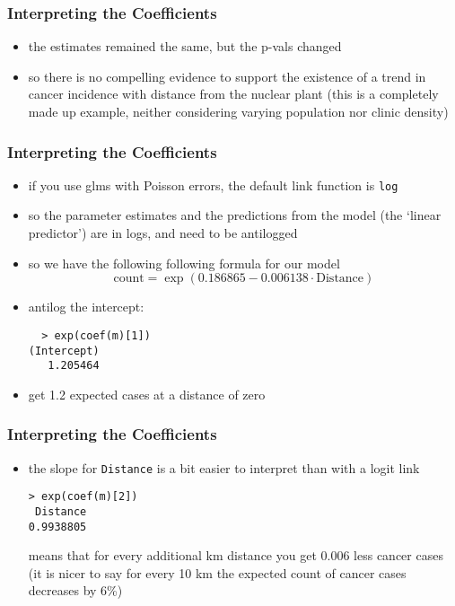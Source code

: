 \begin{frame}[fragile]\frametitle{Interpreting the Coefficients}
  \begin{itemize}
  \item the estimates remained the same, but the p-vals changed
  \item so there is no compelling evidence to support the existence of a trend in cancer incidence with distance
from the nuclear plant (this is a completely made up example, neither considering varying population nor clinic density)
  \end{itemize}
\end{frame}


\begin{frame}[fragile]\frametitle{Interpreting the Coefficients}
  \begin{itemize}
  \item if you use glms with Poisson errors, the default link function is \texttt{log}
  \item so the parameter estimates and the predictions from the model (the ‘linear predictor’) are in logs, and need to be antilogged
  \item so we have the following following formula for our model
$$\mbox{count}=\exp{(0.186865 - 0.006138 \cdot \mbox{Distance})}$$
  \item antilog the intercept:
\begin{verbatim}
  > exp(coef(m)[1])
(Intercept) 
   1.205464 
\end{verbatim}
\item get 1.2 expected cases at a distance of zero
  \end{itemize}
\end{frame}

\begin{frame}[fragile]\frametitle{Interpreting the Coefficients}
  \begin{itemize}
\item the slope for \texttt{Distance} is a bit easier to interpret than with a logit link
\begin{verbatim}
> exp(coef(m)[2])
 Distance 
0.9938805 
\end{verbatim}
means that for every additional km distance you get 0.006 less cancer cases  (it is nicer to say for every 10 km the expected count of cancer cases decreases by 6\%)
  \end{itemize}
\end{frame}


